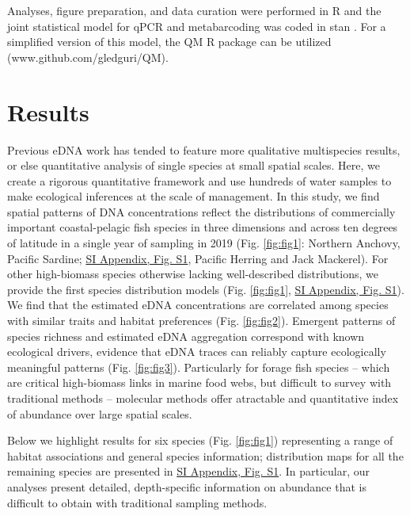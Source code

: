 \documentclass{article}
\begin{document}
Analyses, figure preparation, and data curation were performed in R \cite{rcoreteam2024} and the joint statistical model for qPCR and metabarcoding was coded in stan \cite{standevelopmentteam2023}. For a simplified version of this model, the QM R package can be utilized (www.github.com/gledguri/QM).
\section*{Results}

Previous eDNA work has tended to feature more qualitative multispecies results, or else quantitative analysis of single species at small spatial scales. Here, we create a rigorous quantitative framework and use hundreds of water samples to make ecological inferences at the scale of management. In this study, we find spatial patterns of DNA concentrations reflect the distributions of commercially important coastal-pelagic fish species in three dimensions and across ten degrees of latitude in a single year of sampling in 2019 (Fig. \ref{fig:fig1}: Northern Anchovy, Pacific Sardine; \href{SI_Appendix.pdf}{SI Appendix, Fig. S1}, Pacific Herring and Jack Mackerel). For other high-biomass species otherwise lacking well-described distributions, we provide the first species distribution models (Fig. \ref{fig:fig1}, \href{SI_Appendix.pdf}{SI Appendix, Fig. S1}). We find that the estimated eDNA concentrations are correlated among species with similar traits and habitat preferences (Fig. \ref{fig:fig2}). Emergent patterns of species richness and estimated eDNA aggregation correspond with known ecological drivers, evidence that eDNA traces can reliably capture ecologically meaningful patterns (Fig. \ref{fig:fig3}). Particularly for forage fish species -- which are critical high-biomass links in marine food webs, but difficult to survey with traditional methods \cite{Pikitch2012} -- molecular methods offer atractable and quantitative index of abundance over large spatial scales.

Below we highlight results for six species (Fig. \ref{fig:fig1}) representing a range of habitat associations and general species information; distribution maps for all the remaining species are presented in \href{SI_Appendix.pdf}{SI Appendix, Fig. S1}. In particular, our analyses present detailed, depth-specific information on abundance that is difficult to obtain with traditional sampling methods.
\end{document}
